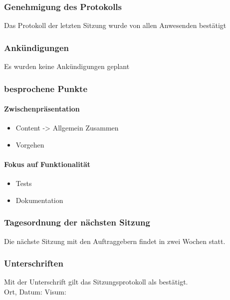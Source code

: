 \subsubsection{Genehmigung des Protokolls}
Das Protokoll der letzten Sitzung wurde von allen Anwesenden bestätigt
\subsubsection{Ankündigungen}
Es wurden keine Ankündigungen geplant
\subsubsection{besprochene Punkte}
\paragraph{Zwischenpräsentation}
\begin{itemize}
	\item Content -> Allgemein Zusammen
	\item Vorgehen 
\end{itemize}

\paragraph{Fokus auf Funktionalität}
\begin{itemize}
	\item Tests
	\item Dokumentation
\end{itemize}


\subsubsection{Tagesordnung der nächsten Sitzung}
Die nächste Sitzung mit den Auftraggebern findet in zwei Wochen statt. 
\subsubsection{Unterschriften}

Mit der Unterschrift gilt das Sitzungsprotokoll als bestätigt.\\

Ort, Datum:	\underline{\hspace*{6cm}}	\hspace*{1cm} Visum:	\underline{\hspace*{4cm}}


